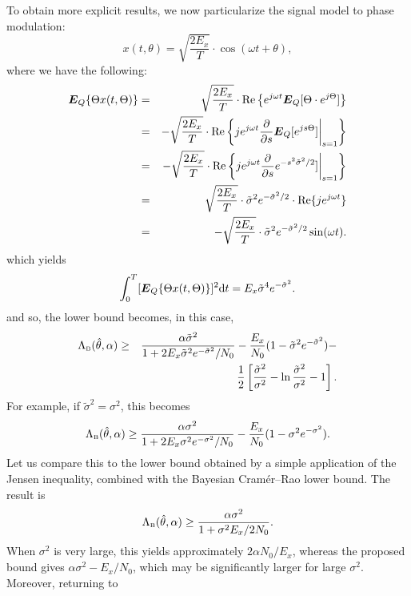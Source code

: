 \documentclass[11pt,epsf]{article}
\newcommand{\tsig}{\tilde{\sigma}}
\newcommand{\ct}{\hat{\theta}}
\newcommand {\bE} {\mbox{\boldmath $E$}}
\begin{document}
To obtain more explicit results, we now particularize the signal model to
phase modulation:
\begin{equation}
x(t,\theta)=\sqrt{\frac{2E_x}{T}}\cdot\cos(\omega
t+\theta),
\end{equation}
where we have the following:
\begin{eqnarray}
\bE_Q\{\Theta
x(t,\Theta)\}&=&\sqrt{\frac{2E_x}{T}}\cdot\mbox{Re}\left\{e^{j\omega t}\bE_Q[\Theta\cdot
e^{j\Theta}]\right\}\nonumber\\
&=&-\sqrt{\frac{2E_x}{T}}\cdot\mbox{Re}\left\{je^{j\omega
t}\frac{\partial}{\partial s}\bE_Q[
e^{js\Theta}]\bigg|_{s=1}\right\}\nonumber\\
&=&-\sqrt{\frac{2E_x}{T}}\cdot\mbox{Re}\left\{je^{j\omega
t}\frac{\partial}{\partial s}
e^{-s^2\tsig^2/2}]\bigg|_{s=1}\right\}\nonumber\\
&=&\sqrt{\frac{2E_x}{T}}\cdot\tsig^2e^{-\tsig^2/2}\cdot\mbox{Re}\{j e^{j\omega
t}\}\nonumber\\
&=& -\sqrt{\frac{2E_x}{T}}\cdot\tsig^2e^{-\tsig^2/2}\sin(\omega t).
\end{eqnarray}
which yields
\begin{equation}
\int_0^T[\bE_Q\{\Theta x(t,\Theta)\}]^2\mbox{d}t= E_x\tsig^4 e^{-\tsig^2}.
\end{equation}
and so, the lower bound becomes, in this case,
\begin{eqnarray}
\label{phase-est}
\Lambda_{\mbox{\tiny B}}(\ct,\alpha)
&\ge&\frac{\alpha\tsig^2}{1+2E_x\tsig^2
e^{-\tsig^2}/N_0}-\frac{E_x}{N_0}(1-\tsig^2 e^{-\tsig^2})-\nonumber\\
& &\frac{1}{2}\left[\frac{\tsig^2}{\sigma^2}-
\ln\frac{\tsig^2}{\sigma^2}-1\right].
\end{eqnarray}
For example, if $\tsig^2=\sigma^2$, this becomes
\begin{equation}
\Lambda_{\mbox{\tiny B}}(\ct,\alpha)\ge
\frac{\alpha\sigma^2}{1+2E_x\sigma^2
e^{-\sigma^2}/N_0}-\frac{E_x}{N_0}(1-\sigma^2 e^{-\sigma^2}).
\end{equation}
Let us compare this to the lower bound obtained by a simple
application of the Jensen inequality, combined with the Bayesian Cram\'er--Rao
lower bound. The result is
\begin{equation}
\Lambda_{\mbox{\tiny B}}(\ct,\alpha)\ge
\frac{\alpha\sigma^2}{1+\sigma^2E_x/2N_0}.
\end{equation}
When $\sigma^2$ is very large, this yields approximately $2\alpha N_0/E_x$,
whereas the proposed bound gives $\alpha\sigma^2-E_x/N_0$, which may be
significantly larger for large $\sigma^2$. Moreover, returning to
\end{document}
